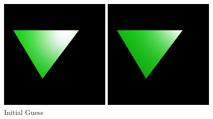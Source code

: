 \documentclass{juliacon}
\begin{document}
\begin{figure}[!htb]
  \includegraphics[width=\linewidth]{images/triangle_initial_guess.jpg}
  \caption{Initial Guess}\label{fig:raytracer1}
\endminipage\hfill
{}
  \includegraphics[width=\linewidth]{images/triangle_100.jpg}

\end{figure}
\end{document}
